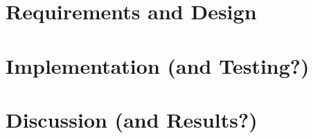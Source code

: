\documentclass[12pt,a4paper]{report}
\begin{document}



%

\chapter{Requirements and Design}




\chapter{Implementation (and Testing?)}




\chapter{Discussion (and Results?)}




\end{document}
